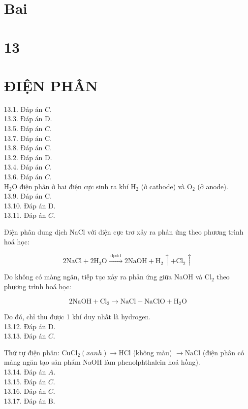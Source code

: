 \documentclass[10pt]{article}
\begin{document}
\section*{Bai}
\section*{13}
\section*{ĐIỆN PHÂN}
13.1. Đáp án $C$.\\
13.3. Đáp án D.\\
13.5. Đáp án $C$.\\
13.7. Đáp án C.\\
13.8. Đáp án C.\\
13.2. Đáp án D.\\
13.4. Đáp án $C$.\\
13.6. Đáp án $C$.\\
$\mathrm{H}_{2} \mathrm{O}$ điện phân ở hai điện cực sinh ra khí $\mathrm{H}_{2}$ (ở cathode) và $\mathrm{O}_{2}$ (ở anode).\\
13.9. Đáp án C.\\
13.10. Đáp án D.\\
13.11. Đáp án $C$.

Điện phân dung dịch NaCl với điện cực trơ xảy ra phản ứng theo phương trình hoá học:

$$
2 \mathrm{NaCl}+2 \mathrm{H}_{2} \mathrm{O} \xrightarrow{\text { đpdd }} 2 \mathrm{NaOH}+\mathrm{H}_{2} \uparrow+\mathrm{Cl}_{2} \uparrow
$$

Do không có màng ngăn, tiếp tục xảy ra phản ứng giữa NaOH và $\mathrm{Cl}_{2}$ theo phương trình hoá học:

$$
2 \mathrm{NaOH}+\mathrm{Cl}_{2} \rightarrow \mathrm{NaCl}+\mathrm{NaClO}+\mathrm{H}_{2} \mathrm{O}
$$

Do đó, chỉ thu được 1 khí duy nhất là hydrogen.\\
13.12. Đáp án D.\\
13.13. Đáp án $C$.

Thứ tự điện phân: $\mathrm{CuCl}_{2}(x a n h) \rightarrow \mathrm{HCl}$ (không màu) $\rightarrow \mathrm{NaCl}$ (điện phân có màng ngăn tạo sản phẩm NaOH làm phenolphthalein hoá hồng).\\
13.14. Đáp án $A$.\\
13.15. Đáp án $C$.\\
13.16. Đáp án $C$.\\
13.17. Đáp án B.
\end{document}
